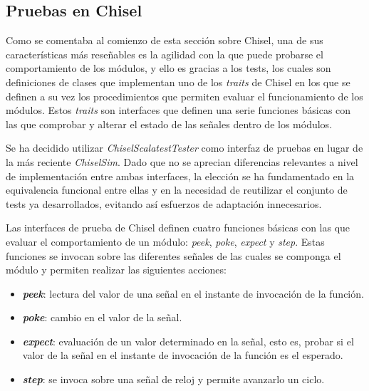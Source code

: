 \subsection{Pruebas en Chisel}

Como se comentaba al comienzo de esta sección sobre Chisel, una de sus características más reseñables es la agilidad con la que puede probarse el comportamiento de los módulos, y ello es gracias a los tests, los cuales son definiciones de clases que implementan uno de los \textit{traits} de Chisel en los que se definen a su vez los procedimientos que permiten evaluar el funcionamiento de los módulos. Estos \textit{traits} son interfaces que definen una serie funciones básicas con las que comprobar y alterar el estado de las señales dentro de los módulos.

Se ha decidido utilizar \textit{ChiselScalatestTester} como interfaz de pruebas en lugar de la más reciente \textit{ChiselSim}. Dado que no se aprecian diferencias relevantes a nivel de implementación entre ambas interfaces, la elección se ha fundamentado en la equivalencia funcional entre ellas y en la necesidad de reutilizar el conjunto de tests ya desarrollados, evitando así esfuerzos de adaptación innecesarios.

Las interfaces de prueba de Chisel definen cuatro funciones básicas con las que evaluar el comportamiento de un módulo: \textit{peek}, \textit{poke},  \textit{expect} y \textit{step}. Estas funciones se invocan sobre las diferentes señales de las cuales se componga el módulo y permiten realizar las siguientes acciones:

\vspace{-0.1cm}
\begin{itemize}
  \item \textbf{\textit{peek}}: lectura del valor de una señal en el instante de invocación de la función.
  \vspace{-0.3cm}
  \item \textbf{\textit{poke}}: cambio en el valor de la señal.
  \vspace{-0.3cm}
  \item \textbf{\textit{expect}}: evaluación de un valor determinado en la señal, esto es, probar si el valor de la señal en el instante de invocación de la función es el esperado.
  \vspace{-0.3cm}
  \item \textbf{\textit{step}}: se invoca sobre una señal de reloj y permite avanzarlo un ciclo.
\end{itemize}
\vspace{-0.1cm}

